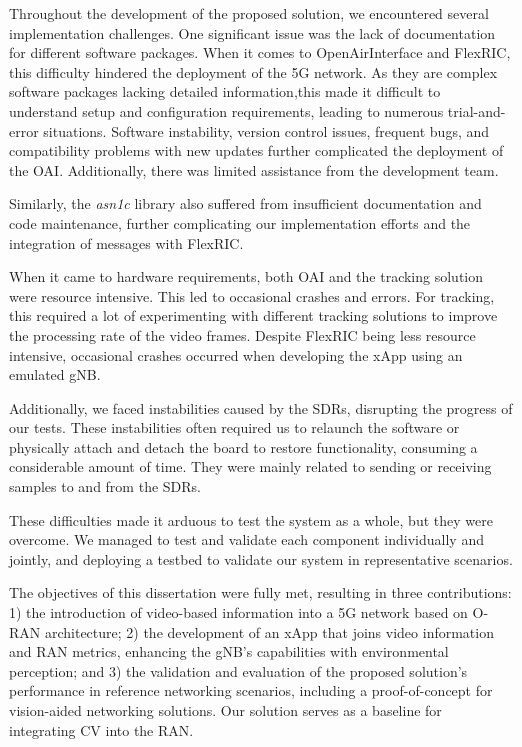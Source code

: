 Throughout the development of the proposed solution, we encountered several implementation challenges.
One significant issue was the lack of documentation for different software packages.
When it comes to OpenAirInterface and FlexRIC, this difficulty hindered the deployment of the 5G network.
As they are complex software packages lacking detailed information,this made it difficult to understand setup and configuration requirements, leading to numerous trial-and-error situations.
Software instability, version control issues, frequent bugs, and compatibility problems with new updates further complicated the deployment of the OAI\@.
Additionally, there was limited assistance from the development team.

Similarly, the \emph{asn1c} library also suffered from insufficient documentation and code maintenance, further complicating our implementation efforts and the integration of messages with FlexRIC\@.

When it came to hardware requirements, both OAI and the tracking solution were resource intensive.
This led to occasional crashes and errors.
For tracking, this required a lot of experimenting with different tracking solutions to improve the processing rate of the video frames.
Despite FlexRIC being less resource intensive, occasional crashes occurred when developing the xApp using an emulated gNB\@.

Additionally, we faced instabilities caused by the SDRs, disrupting the progress of our tests.
These instabilities often required us to relaunch the software or physically attach and detach the board to restore functionality, consuming a considerable amount of time.
They were mainly related to sending or receiving samples to and from the SDRs.

These difficulties made it arduous to test the system as a whole, but they were overcome.
We managed to test and validate each component individually and jointly, and deploying a testbed to validate our system in representative scenarios.

The objectives of this dissertation were fully met, resulting in three contributions: 1) the introduction of video-based information into a 5G network based on O-RAN architecture; 2) the development of an xApp that joins video information and RAN metrics, enhancing the gNB's capabilities with environmental perception; and 3) the validation and evaluation of the proposed solution's performance in reference networking scenarios, including a proof-of-concept for vision-aided networking solutions.
Our solution serves as a baseline for integrating CV into the RAN\@.

